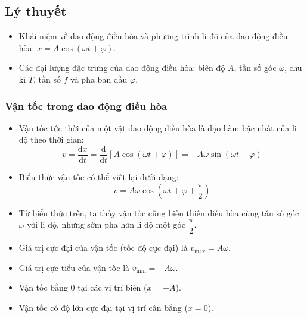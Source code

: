 

\subsection{Lý thuyết}

\begin{emdahoc}
\begin{itemize}
    \item Khái niệm về dao động điều hòa và phương trình li độ của dao động điều hòa: $x = A\cos(\omega t + \varphi)$.
    \item Các đại lượng đặc trưng của dao động điều hòa: biên độ $A$, tần số góc $\omega$, chu kì $T$, tần số $f$ và pha ban đầu $\varphi$.
\end{itemize}
\end{emdahoc}

\subsubsection{Vận tốc trong dao động điều hòa}

\begin{hoatdong}
\end{hoatdong}

\begin{kienthuc}
\begin{itemize}
    \item Vận tốc tức thời của một vật dao động điều hòa là đạo hàm bậc nhất của li độ theo thời gian:
    $$v = \dfrac{\mathrm{d}x}{\mathrm{d}t} = \dfrac{\mathrm{d}}{\mathrm{d}t}[A\cos(\omega t + \varphi)] = -A\omega\sin(\omega t + \varphi)$$
    \item Biểu thức vận tốc có thể viết lại dưới dạng:
    $$v = A\omega\cos\left(\omega t + \varphi + \dfrac{\pi}{2}\right)$$
    \item Từ biểu thức trên, ta thấy vận tốc cũng biến thiên điều hòa cùng tần số góc $\omega$ với li độ, nhưng sớm pha hơn li độ một góc $\dfrac{\pi}{2}$.
    \item Giá trị cực đại của vận tốc (tốc độ cực đại) là $v_{\text{max}} = A\omega$.
    \item Giá trị cực tiểu của vận tốc là $v_{\text{min}} = -A\omega$.
    \item Vận tốc bằng 0 tại các vị trí biên ($x = \pm A$).
    \item Vận tốc có độ lớn cực đại tại vị trí cân bằng ($x = 0$).
\end{itemize}
\end{kienthuc}


